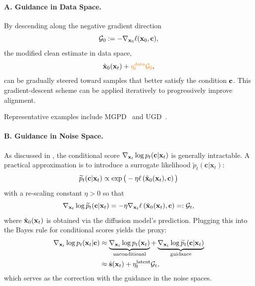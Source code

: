 \paragraph{A. Guidance in Data Space.}  
By descending along the negative gradient direction 
\[
\mathcal{G}_0 := -\nabla_{{\mathbf{x}}_0} \ell({\mathbf{x}}_0, {\mathbf{c}}),
\]
the modified clean estimate in data space,
\[
\hat{{\mathbf{x}}}_0({\mathbf{x}}_t) + {\color{orange}\eta_t^{\text{data}} \mathcal{G}_0},
\]
can be gradually steered toward samples that better satisfy the condition ${\mathbf{c}}$. This gradient-descent scheme can be applied iteratively to progressively improve alignment.

Representative examples include MGPD~\citep{he2023manifold} and UGD~\citep{bansal2023universal}.




\paragraph{B. Guidance in Noise Space.}  
As discussed in , the conditional score $\nabla_{{\mathbf{x}}_t} \log p_t({\mathbf{c}}|{\mathbf{x}}_t)$ is generally intractable. A practical approximation is to introduce a surrogate likelihood $\widetilde p_t(\mathbf{c}|\mathbf{x}_t)$:
\[
\widetilde p_t(\mathbf{c}|\mathbf{x}_t) \propto \exp \big(-\eta\ell \left(\hat{{\mathbf{x}}}_0({\mathbf{x}}_t), {\mathbf{c}}\right)\big)
\]
with a re-scaling constant $\eta>0$ so that
\[
\nabla_{{\mathbf{x}}_t}\log \widetilde p_t(\mathbf{c}|\mathbf{x}_t) = -\eta\nabla_{{\mathbf{x}}_t}\ell \left(\hat{{\mathbf{x}}}_0({\mathbf{x}}_t), {\mathbf{c}}\right) =: \mathcal{G}_t,
\]
where $\hat{{\mathbf{x}}}_0({\mathbf{x}}_t)$ is obtained via the diffusion model's prediction. 
Plugging this into the Bayes rule for conditional scores yields the proxy:
\begin{align*}
\nabla_{{\mathbf{x}}_t} \log p_t({\mathbf{x}}_t|{\mathbf{c}}) 
&\approx \underbrace{\nabla_{{\mathbf{x}}_t} \log p_t({\mathbf{x}}_t)}_{\text{unconditional}} 
+ \underbrace{\nabla_{{\mathbf{x}}_t} \log \widetilde p_t(\mathbf{c}|\mathbf{x}_t)}_{\text{guidance}} 
\\&\approx \hat{{\mathbf{s}}}({\mathbf{x}}_t) + \eta_t^{\text{latent}} \mathcal{G}_t,
\end{align*}
which serves as the correction with the guidance in the noise spaces.



